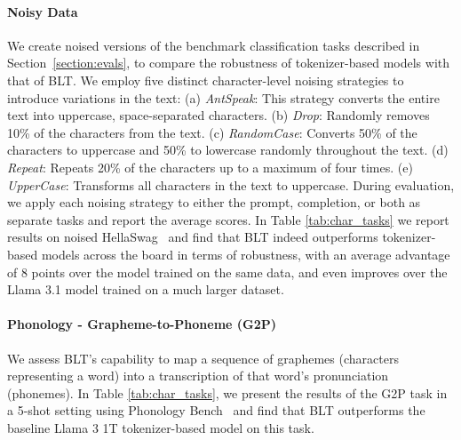 \paragraph{Noisy Data} We create noised versions of the benchmark classification tasks described in Section~\ref{section:evals}, to compare the robustness of tokenizer-based models with that of {\textsc BLT}. We employ five distinct character-level noising strategies to introduce variations in the text: (a) \textit{AntSpeak}: This strategy converts the entire text into uppercase, space-separated characters. (b) \textit{Drop}: Randomly removes 10\% of the characters from the text. (c) \textit{RandomCase}: Converts 50\% of the characters to uppercase and 50\% to lowercase randomly throughout the text. (d) \textit{Repeat}:  Repeats 20\% of the characters up to a maximum of four times. (e) \textit{UpperCase}: Transforms all characters in the text to uppercase. During evaluation, we apply each noising strategy to either the prompt, completion, or both as separate tasks and report the average scores. In Table \ref{tab:char_tasks} we report results on noised HellaSwag~\citep{Eval_hellaswag} and find that {\textsc BLT} indeed outperforms tokenizer-based models across the board in terms of robustness, with an average advantage of 8 points over the model trained on the same data, and even improves over the Llama 3.1 model trained on a much larger dataset.

\paragraph{Phonology - Grapheme-to-Phoneme (G2P)} We assess {\textsc BLT}'s capability to map a sequence of graphemes (characters representing a word) into a transcription of that word's pronunciation (phonemes). In Table \ref{tab:char_tasks}, we present the results of the G2P task in a 5-shot setting using Phonology Bench~\citep{suvarna2024phonologybench} and find that {\textsc BLT} outperforms the baseline Llama 3 1T tokenizer-based model on this task.

